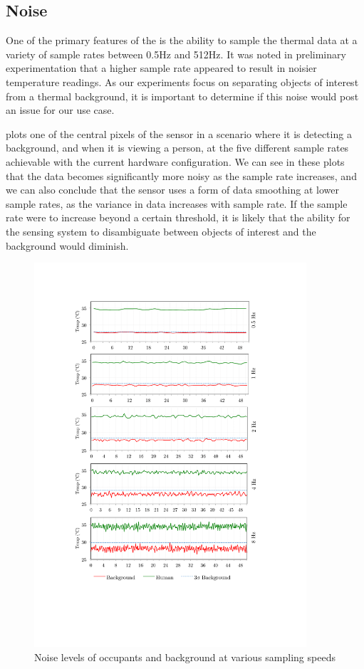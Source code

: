 \documentclass[../thesis/thesis.tex]{subfiles}
\begin{document}
\subsection{Noise}

One of the primary features of the \mlx is the ability to sample the thermal data at a variety of sample rates between 0.5Hz and 512Hz. It was noted in preliminary experimentation that a higher sample rate appeared to result in noisier temperature readings. As our experiments focus on separating objects of interest from a thermal background, it is important to determine if this noise would post an issue for our use case.

 plots one of the central pixels of the sensor in a scenario where it is detecting a background, and when it is viewing a person, at the five different sample rates achievable with the current hardware configuration. We can see in these plots that the data becomes significantly more noisy as the sample rate increases, and we can also conclude that the sensor uses a form of data smoothing at lower sample rates, as the variance in data increases with sample rate. If the sample rate were to increase beyond a certain threshold, it is likely that the ability for the sensing system to disambiguate between objects of interest and the background would diminish.

\begin{figure}
  \centering
  \includegraphics[width=0.9\textwidth]{../diagrams/noise-graph2.pdf}
  \caption{Noise levels of occupants and background at various sampling speeds}
  \label{fig:noise} %
\end{figure}
\end{document}
